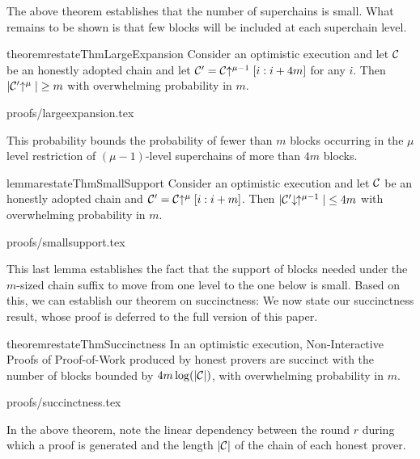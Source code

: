   The above theorem establishes that the number of superchains is small. What
  remains to be shown is that few blocks will be included at each superchain
  level.

  \begin{restatable}{theorem}{restateThmLargeExpansion}
      \label{thm.large-expansion}
      Consider an optimistic execution and let $\mathcal{C}$ be an honestly adopted
      chain and let $\mathcal{C}' = \mathcal{C}\negthickspace\uparrow^{\mu - 1}[i:i + 4m]$ for any $i$.
      Then $|\mathcal{C}'\negthickspace\uparrow^\mu| \geq m$ with overwhelming probability in $m$.
  \end{restatable}
  \ifonecolumn
  {proofs/largeexpansion.tex}
  \fi

  This probability bounds the probability of fewer than $m$ blocks occurring in
  the $\mu$ level restriction of $(\mu - 1)$-level superchains of more than $4m$
  blocks.

  \begin{restatable}{lemma}{restateThmSmallSupport}
      \label{lem.small-support}
      Consider an optimistic execution and let $\mathcal{C}$ be an honestly adopted
      chain and $\mathcal{C}' = \mathcal{C}\negthickspace\uparrow^\mu[i:i + m]$. Then
      $|\mathcal{C}'\negthickspace\downarrow\,\negthickspace\uparrow^{\mu - 1}| \leq 4m$ with overwhelming
      probability in $m$.
  \end{restatable}
  \ifonecolumn
  {proofs/smallsupport.tex}
  \fi

  This last lemma establishes the fact that the support of blocks needed under
  the $m$-sized chain suffix to move from one level to the one below is small.
  Based on this, we can establish our theorem on succinctness:
\else
  We now state our succinctness result, whose proof is deferred to the full
  version of this paper.
\fi

\begin{restatable}{theorem}{restateThmSuccinctness}
    \label{thm.succinctness}
    In an optimistic execution, Non-Interactive Proofs of Proof-of-Work produced
    by honest provers are succinct with the number of blocks bounded by $4m
    \log(|\mathcal{C}|)$, with overwhelming probability in $m$.
\end{restatable}
\ifonecolumn
{proofs/succinctness.tex}
\fi

In the above theorem, note the linear dependency between the round $r$ during
which a proof is generated and the length $|\mathcal{C}|$ of the chain of each honest
prover.
